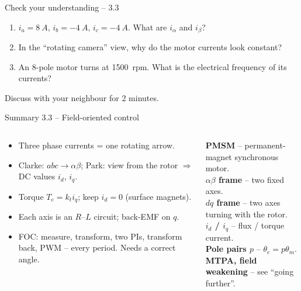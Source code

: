 \documentclass[aspectratio=169,10pt]{beamer}
\begin{document}
\begin{frame}[t]{Check your understanding -- 3.3}
\vspace{4mm}
\begin{keybox}
\large
\begin{enumerate}
\item $i_a=\SI{8}{A}$, $i_b=\SI{-4}{A}$, $i_c=\SI{-4}{A}$. What are $i_\alpha$ and $i_\beta$?\\[3mm]
\item In the ``rotating camera'' view, why do the motor currents look constant?\\[3mm]
\item An 8-pole motor turns at \SI{1500}{rpm}. What is the electrical frequency of its currents?
\end{enumerate}
\end{keybox}
\vfill
\centering\small\color{mkGray} Discuss with your neighbour for 2 minutes.
\end{frame}

\begin{frame}{Summary 3.3 -- Field-oriented control}
\begin{columns}[T,onlytextwidth]
\begin{keybox}
\small
\begin{itemize}
\item Three phase currents = one rotating arrow.
\item Clarke: $abc\to\alpha\beta$; Park: view from the rotor $\Rightarrow$ DC values $i_d$, $i_q$.
\item Torque $T_e=k_ti_q$; keep $i_d=0$ (surface magnets).
\item Each axis is an $R$--$L$ circuit; back-EMF on $q$.
\item FOC: measure, transform, two PIs, transform back, PWM -- every period. Needs a correct angle.
\end{itemize}
\end{keybox}
\begin{defbox}
\small
\textbf{PMSM} -- permanent-magnet synchronous motor.\\
\textbf{$\alpha\beta$ frame} -- two fixed axes.\\
\textbf{$dq$ frame} -- two axes turning with the rotor.\\
\textbf{$i_d$ / $i_q$} -- flux / torque current.\\
\textbf{Pole pairs $p$} -- $\theta_e=p\theta_m$.\\
\textbf{MTPA, field weakening} -- see ``going further''.
\end{defbox}
\end{columns}
\end{frame}
\end{document}
